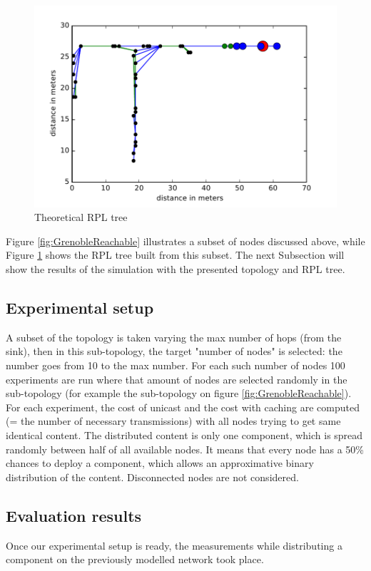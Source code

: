 \begin{figure}[]
	\centering
	\includegraphics[width=0.8 \columnwidth]{chapters/calpulli.images/grenoble-RPL.pdf}
	\caption{Theoretical RPL tree} \label{fig:GrenobleRPL}
\end{figure}

Figure \ref{fig:GrenobleReachable} illustrates a subset of nodes discussed above, while Figure \ref{fig:GrenobleRPL} shows the RPL tree built from this subset.
The next Subsection will show the results of the simulation with the presented topology and RPL tree.

\subsection{Experimental setup}
A subset of the topology is taken varying the max number of hops (from the sink), then in this sub-topology, the target "number of nodes" is selected: the number goes from 10 to the max number.
For each such number of nodes 100 experiments are run where that amount of nodes are selected randomly in the sub-topology (for example the sub-topology on figure \ref{fig:GrenobleReachable}).
For each experiment, the cost of unicast and the cost with caching are computed (= the number of necessary transmissions) with all nodes trying to get same identical content.
The distributed content is only one component, which is spread randomly between half of all available nodes.
It means that every node has a 50\% chances to deploy a component, which allows an approximative binary distribution of the content.
Disconnected nodes are not considered.

\subsection{Evaluation results}
Once our experimental setup is ready, the measurements while distributing a component on the previously modelled network took place.

